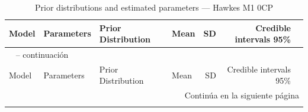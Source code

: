 \begin{longtable}{llllrrr}
\caption{Prior distributions and estimated parameters --- Hawkes M1 0CP} \label{tab:hawkes_params_0cp} \\
\toprule
Model & Parameters & Prior Distribution & Mean & SD & Credible intervals 95\% \\
\midrule
\endfirsthead

\multicolumn{7}{l}{\tablename\ \thetable{} -- continuaci\'{o}n} \\
\toprule
Model & Parameters & Prior Distribution & Mean & SD & Credible intervals 95\% \\
\midrule
\endhead

\midrule
\multicolumn{7}{r}{Contin\'{u}a en la siguiente p\'{a}gina} \\
\endfoot

\bottomrule
\endlastfoot


\end{longtable}
